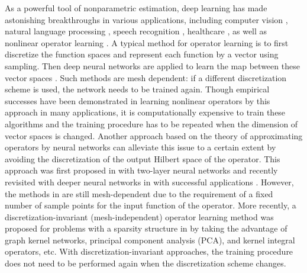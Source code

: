 \documentclass[11pt]{article} %
\begin{document}
As a powerful tool of nonparametric estimation, deep learning \citep{goodfellow2016deep} has made astonishing breakthroughs in various applications, including computer vision \citep{krizhevsky2012imagenet}, natural language processing \citep{graves2013speech}, speech recognition \citep{hinton2012deep}, healthcare \citep{miotto2017deep}, as well as nonlinear operator learning \citep{khoo2021solving,ZHU2018415,MNN,FAN20191,switchnet,chen1995universal,deeponet,lanthaler2021error,bhattacharya2020model,li2020fourier,nelsen2020random}. A typical method for operator learning is to first discretize the function spaces and represent each function by a vector using sampling. Then deep neural networks are applied to learn the map between these vector spaces \citep{khoo2021solving,ZHU2018415,MNN,FAN20191,switchnet}. Such methods are mesh dependent: if a different discretization scheme is used, the network needs to be trained again.
Though empirical successes have been demonstrated in learning nonlinear operators by this approach in many applications, it is computationally expensive to train these algorithms and the training procedure has to be repeated when the dimension of vector spaces is changed. Another approach based on the theory of approximating operators by neural networks \citep{chen1995universal} can alleviate this issue to a certain extent by avoiding the discretization of the output Hilbert space of the operator. This approach was first proposed in \citep{chen1995universal} with two-layer neural networks and recently revisited with deeper neural networks in \citep{deeponet} with successful applications \citep{doi:10.1063/5.0041203,CAI2021110296}. However, the methods in \citep{chen1995universal,deeponet,doi:10.1063/5.0041203,CAI2021110296} are still mesh-dependent due to the requirement of a fixed number of sample points for the input function of the operator. More recently, a discretization-invariant (mesh-independent) operator learning method 
was proposed for problems with a sparsity structure in \citep{li2020neural,bhattacharya2020model,li2020fourier,nelsen2020random} by taking the advantage of graph kernel networks, principal component analysis (PCA), %
and kernel integral operators, etc. With discretization-invariant approaches, the training procedure does not need to be performed again when the discretization scheme changes.
\end{document}
